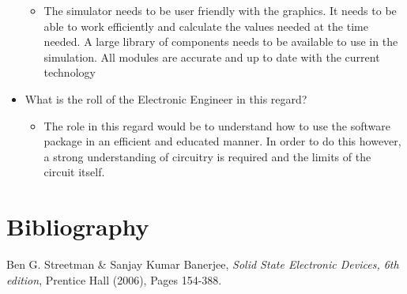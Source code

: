 \documentclass[12pt]{article}
\begin{document}
\begin{itemize}
\begin{itemize}
\item The simulator needs to be user friendly with the graphics. It needs to be able to work efficiently and calculate the values needed at the time needed. A large library of components needs to be available to use in the simulation. All modules are accurate and up to date with the current technology
\end{itemize}
\item What is the roll of the Electronic Engineer in this regard?\begin{itemize}
\item The role in this regard would be to understand how to use the software package in an efficient and educated manner. In order to do this however, a strong understanding of circuitry is required and the limits of the circuit itself.
\end{itemize}
\end {itemize}
\section{Bibliography}
\begin{thebibliography}{3}
  Ben G. Streetman \& Sanjay Kumar Banerjee,
  \emph{Solid State Electronic Devices, 6th edition},
  Prentice Hall (2006),
  Pages 154-388.
\end{thebibliography}
\end{document}
